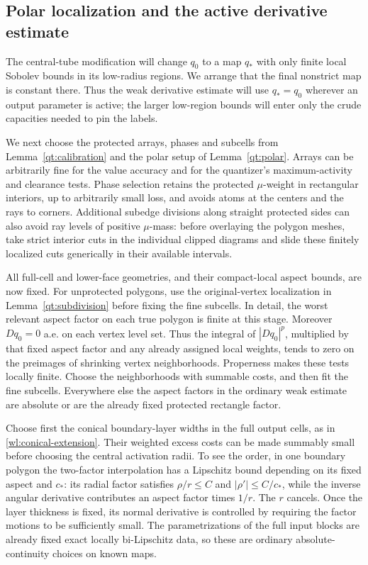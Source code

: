 \subsection{Polar localization and the active derivative estimate}
\label{ha:active-localization}

The central-tube modification will change $q_0$ to a map $q_*$
with only finite local Sobolev bounds in its low-radius regions.
We arrange that the final nonstrict map is constant there.
Thus the weak derivative estimate will use $q_*=q_0$ wherever
an output parameter is active; the larger low-region bounds will
enter only the crude capacities needed to pin the labels.

We next choose the protected arrays, phases and subcells from
Lemma~\ref{qt:calibration} and the polar setup of
Lemma~\ref{qt:polar}.  Arrays can be arbitrarily fine for the value
accuracy and for the quantizer's maximum-activity and clearance tests.
Phase selection retains the protected $\mu$-weight in rectangular
interiors, up to arbitrarily small loss, and avoids atoms at the
centers and the rays to corners.  Additional subedge divisions along
straight protected sides can also avoid ray levels of positive
$\mu$-mass: before overlaying the polygon meshes, take strict interior
cuts in the individual clipped diagrams and slide these finitely
localized cuts generically in their available intervals.

All full-cell and lower-face geometries, and their compact-local
aspect bounds, are now fixed.  For unprotected polygons, use the
original-vertex localization in Lemma~\ref{qt:subdivision} before
fixing the fine subcells.  In detail, the worst relevant aspect factor
on each true polygon is finite at this stage.  Moreover $Dq_0=0$ a.e.
on each vertex level set.  Thus the integral of $|Dq_0|^p$, multiplied
by that fixed aspect factor and any already assigned local weights,
tends to zero on the preimages of shrinking vertex neighborhoods.
Properness makes these tests locally finite.  Choose the neighborhoods
with summable costs, and then fit the fine subcells.  Everywhere else
the aspect factors in the ordinary weak estimate are absolute or
are the already fixed protected rectangle factor.

Choose first the conical boundary-layer widths in the full output
cells, as in \eqref{wl:conical-extension}.  Their weighted excess
costs can be made summably small before choosing the central activation
radii.  To see the order, in one boundary polygon the two-factor
interpolation has a Lipschitz bound depending on its fixed aspect and
$c_*$: its radial factor satisfies $\rho/r\le C$ and
$|\rho'|\le C/c_*$, while the inverse angular derivative contributes
an aspect factor times $1/r$.  The $r$ cancels.  Once the layer
thickness is fixed, its normal derivative is controlled by requiring
the factor motions to be sufficiently small.  The parametrizations
of the full input blocks are already fixed exact locally bi-Lipschitz
data, so these are ordinary absolute-continuity choices on known
maps.


